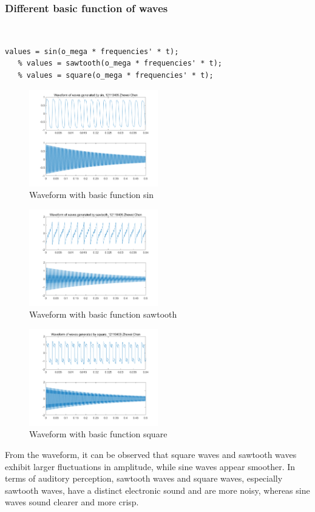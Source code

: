 \documentclass[journal]{IEEEtran}
\begin{document}
\subsubsection{Different basic function of waves}

$~$
\begin{lstlisting}[style=Matlab-editor]
   values = sin(o_mega * frequencies' * t); 
   % values = sawtooth(o_mega * frequencies' * t); 
   % values = square(o_mega * frequencies' * t);
   \end{lstlisting}

\begin{figure}[htbp]
   \centering
   \includegraphics[width=0.5\textwidth]{1.png} 
   \caption{Waveform with basic function sin}
   \label{fig:4}
\end{figure}


\begin{figure}[htbp]
   \centering
   \includegraphics[width=0.5\textwidth]{2.png} 
   \caption{Waveform with basic function sawtooth}
   \label{fig:4}
\end{figure}


\begin{figure}[htbp]
   \centering
   \includegraphics[width=0.5\textwidth]{3.png} 
   \caption{Waveform with basic function square}
   \label{fig:4}
\end{figure}
From the waveform, it can be observed that square waves and sawtooth waves exhibit larger fluctuations in amplitude, while sine waves appear smoother. In terms of auditory perception, sawtooth waves and square waves, especially sawtooth waves, have a distinct electronic sound and are more noisy, whereas sine waves sound clearer and more crisp.
\end{document}
